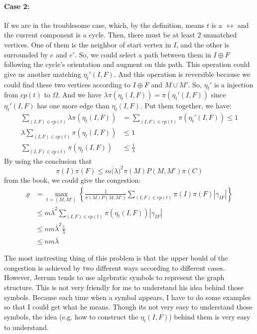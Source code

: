 \documentclass{article}
\begin{document}
\paragraph{Case 2:} If we are in the troublesome case, which, by the definition, means $t$ is a $\leftrightarrow$ and the current component is a cycle. Then, there must be at least 2 unmatched vertices. One of them is the neighbor of start vertex in $I$, and the other is surrounded by $e$ and $e'$. 
So, we could select a path between them in $I\oplus F$ following the cycle's orientation and augment on this path. This operation could give us another matching $\eta_t'(I, F)$. And this operation is reversible because we could find these two vertices according to $I\oplus F$ and $M\cup M'$. So, $\eta_t'$ is a injection from $cp(t)$ to $\Omega$. And we have $\lambda\pi(\eta_t(I, F)) = \pi(\eta_t'(I, F))$ since $\eta_t'(I, F)$ has one more edge than $\eta_t(I, F)$. Put them together, we have:
\begin{align*}
  \sum_{(I, F)\in cp(t)} \lambda\pi(\eta_t(I, F)) &= \sum_{(I, F)\in cp(t)} \pi(\eta_t'(I, F)) \leq 1 \\
  \lambda\sum_{(I, F)\in cp(t)} \pi(\eta_t(I, F)) &\leq 1 \\
  \sum_{(I, F)\in cp(t)} \pi(\eta_t(I, F)) &\leq \frac{1}{\lambda}
\end{align*}
By using the conclusion that \[\pi(I)\pi(F)\leq m\overline(\lambda)^2\pi(M)P(M, M')\pi(C)\] from the book, we could give the congestion:
\begin{align*}
  \varrho &= \max_{t = (M, M')} \left\{\frac{1}{\pi(M)P(M, M')}\sum_{(I,F)\in cp(t)} \pi(I)\pi(F)|\gamma_{IF}|\right\} \\
  &\leq m\overline{\lambda}^2 \sum_{(I, F)\in cp(t)} \pi(\eta_t(I, F))|\gamma_{IF}| \\
  &\leq nm\overline{\lambda}^2 \frac{1}{\lambda} \\
  &\leq nm\overline{\lambda}
\end{align*}

\begin{tcolorbox}[title = {Note:}]
  The most instresting thing of this problem is that the upper bould of the congestion is achieved by two different ways according to different cases.
  However, Jerrum tends to use algebratic symbols to represent the graph structure. This is not very friendly for me to understand his idea behind those symbols. Because each time when a symbol appears, I have to do some examples so that I could get what he means. Though its not very easy to understand those symbols, the idea (e.g. how to construct the $\eta_t(I, F)$) behind them is very easy to understand.
\end{tcolorbox}
\end{document}
